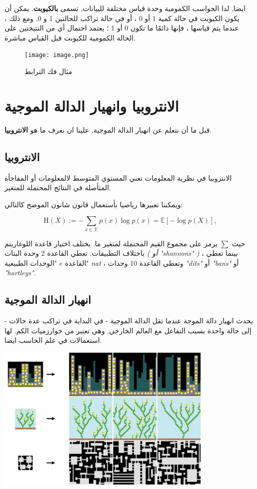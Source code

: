 \documentclass[a4paper,12pt,openright,twoside]{book}
\begin{document}
ايضا, لدا الحواسب الكمومية وحدة قياس مختلفة للبيانات, تسمى 
\textbf{بالكيوبت\dash {}}.
يمكن أن يكون الكيوبت في حالة كمية 1 أو 0 ، أو في حالة تراكب للحالتين 1 و 0. ومع ذلك ، عندما يتم قياسها ، فإنها دائمًا ما تكون 0 أو 1 ؛ يعتمد احتمال أي من النتيجتين على الحالة الكمومية للكيوبت قبل القياس مباشرة.


\begin{figure}
	\centering
	\texttt{[image: image.png]}
	\caption{مثال فك الترابط}
	\label{fig:dec}
\end{figure} \newpage


\section{الانتروبيا وانهيار الدالة الموجية}

قبل ما أن نتعلم عن انهيار الدالة الموجية, علينا ان نعرف ما هو
\textbf{الانتروبيا\dash {}}.

\subsection{الانتروبيا}

الانتروبيا في نظرية المعلومات تعني المستوي المتوسط لالمعلومات أو المفاجأة المتأصلة في النتائج المحتملة للمتغير.

ويمكننا تعبيرها رياضيا بأستعمال قانون شانون الموضح كالتالي:

$$
{\displaystyle \mathrm{H}(X) := -\sum _{x\in {\mathcal {X}}}p(x)\log p(x)= \mathbb{E} [-\log p(X)],}
$$

حيث
$ \sum $
يرمز على مجموع القيم المحتملة لمتغير ما.
يختلف اختيار قاعدة اللوغاريتم باختلاف التطبيقات. تعطي القاعدة 2 وحدة البتات 
\emph{( أو "shannons" )} ، بينما تعطي القاعدة $ e $ "الوحدات الطبيعية" \emph{nat} ، وتعطي القاعدة 10 وحدات \emph{"dits"} أو \emph{"bans"} أو \emph{"hartleys"}.

\subsection{انهيار الدالة الموجية}

يحدث انهيار دالة الموجة عندما تقل الدالة الموجية - في البداية في تراكب عدة حالات - إلى حالة واحدة بسبب التفاعل مع العالم الخارجي. وهي تعتبر من خوارزميات الكم. لها استعمالات في علم الحاسب ايضا.

\begin{center}
	\includegraphics[width=\textwidth, height=7cm]{wfc-examples.png}
	\label{fig:wfc}
\end{center} \newpage
\end{document}
